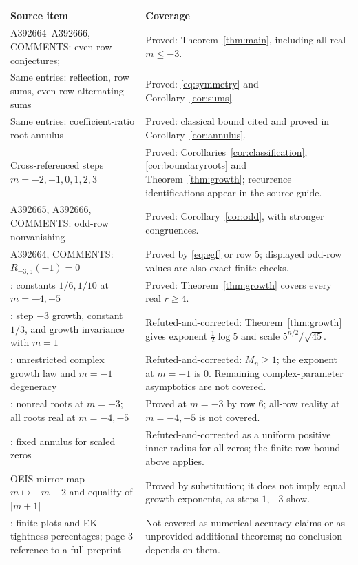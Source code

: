 \small
\begin{longtable}{@{}p{.46\linewidth}p{.47\linewidth}@{}}
\toprule
Source item & Coverage \\
\midrule
\endhead
A392664--A392666, COMMENTS: even-row conjectures;
\cite[p.~1, Conjecture~2]{chen}
& Proved: Theorem~\ref{thm:main}, including all real $m\leq-3$. \\
Same entries: reflection, row sums, even-row alternating sums
& Proved: \eqref{eq:symmetry} and Corollary~\ref{cor:sums}. \\
Same entries: coefficient-ratio root annulus
& Proved: classical bound cited and proved in Corollary~\ref{cor:annulus}. \\
Cross-referenced steps $m=-2,-1,0,1,2,3$
& Proved: Corollaries~\ref{cor:classification}, \ref{cor:boundaryroots}
and Theorem~\ref{thm:growth}; recurrence identifications appear
in the source guide. \\
A392665, A392666, COMMENTS: odd-row nonvanishing
& Proved: Corollary~\ref{cor:odd}, with stronger congruences. \\
A392664, COMMENTS: $R_{-3,5}(-1)=0$
& Proved by \eqref{eq:egf} or row 5; displayed odd-row values
are also exact finite checks. \\
\cite[pp.~2--3]{chen}: constants $1/6,1/10$ at $m=-4,-5$
& Proved: Theorem~\ref{thm:growth} covers every real $r\geq4$. \\
\cite[p.~1, Theorem~1; pp.~2--3]{chen}: step $-3$ growth,
constant $1/3$, and growth invariance with $m=1$
& Refuted-and-corrected: Theorem~\ref{thm:growth} gives exponent
$\tfrac12\log5$ and scale $5^{n/2}/\sqrt{45}$. \\
\cite[p.~1, Theorem~1; p.~2]{chen}: unrestricted complex growth
law and $m=-1$ degeneracy
& Refuted-and-corrected: $M_n\geq1$; the exponent at $m=-1$ is 0.
Remaining complex-parameter asymptotics are not covered. \\
\cite[pp.~2--3]{chen}: nonreal roots at $m=-3$; all roots real
at $m=-4,-5$
& Proved at $m=-3$ by row 6; all-row reality at $m=-4,-5$
is not covered. \\
\cite[p.~2]{chen}: fixed annulus for scaled zeros
& Refuted-and-corrected as a uniform positive inner radius for
all zeros; the finite-row bound above applies. \\
OEIS mirror map $m\mapsto-m-2$ and equality of $|m+1|$
& Proved by substitution; it does not imply equal growth
exponents, as steps $1,-3$ show. \\
\cite[pp.~2--3]{chen}: finite plots and EK tightness percentages;
page-3 reference to a full preprint
& Not covered as numerical accuracy claims or as unprovided
additional theorems; no conclusion depends on them. \\
\bottomrule
\end{longtable}
\normalsize
